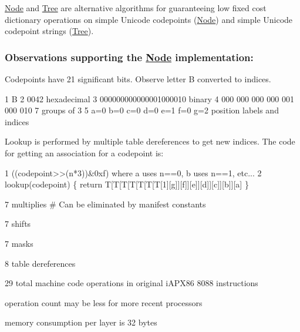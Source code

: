 \hyperlink{class_node}{Node} and \hyperlink{class_tree}{Tree} are alternative algorithms for guaranteeing low fixed cost dictionary operations on simple Unicode codepoints (\hyperlink{class_node}{Node}) and simple Unicode codepoint strings (\hyperlink{class_tree}{Tree}).

\subsubsection*{Observations supporting the \hyperlink{class_node}{Node} implementation\+:}

Codepoints have 21 significant bits. Observe letter B converted to indices. 
\begin{DoxyCode}
1 B
2 0042                          hexadecimal
3 000000000000001000010         binary
4 000 000 000 000 001 000 010   7 groups of 3
5 a=0 b=0 c=0 d=0 e=1 f=0 g=2   position labels and indices
\end{DoxyCode}


Lookup is performed by multiple table dereferences to get new indices. The code for getting an association for a codepoint is\+: 
\begin{DoxyCode}
1 ((codepoint>>(n*3))&0xf) where a uses n==0, b uses n==1, etc...
2 lookup(codepoint) \{ return T[T[T[T[T[T[T[1][g]][f]][e]][d]][c]][b]][a] \}
\end{DoxyCode}

\begin{DoxyItemize}
\item 7 multiplies \# Can be eliminated by manifest constants
\item 7 shifts
\item 7 masks
\item 8 table dereferences
\item 29 total machine code operations in original i\+A\+P\+X86 8088 instructions
\item operation count may be less for more recent processors
\item memory consumption per layer is 32 bytes
\end{DoxyItemize}

